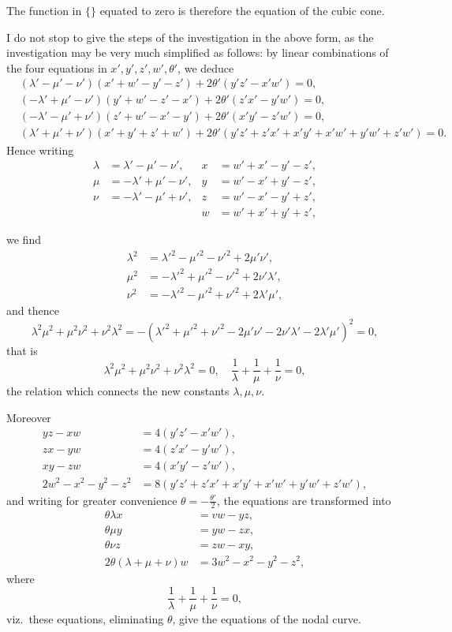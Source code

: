 \documentclass[11pt,a4paper]{article}
\theoremstyle{definition}
\begin{document}
The function in $\{\}$ equated to zero is therefore the equation of the cubic cone.

I do not stop to give the steps of the investigation in the above form, as the investigation may be very much simplified as follows: by linear combinations of the four equations in $x', y', z', w', \theta'$, we deduce
\begin{align*}
&(\lambda' - \mu' - \nu')(x'+w'-y'-z') + 2\theta'(y'z' - x'w') = 0,\\
&(-\lambda' + \mu' - \nu')(y'+w'-z'-x') + 2\theta'(z'x' - y'w') = 0,\\
&(-\lambda' - \mu' + \nu')(z'+w'-x'-y') + 2\theta'(x'y' - z'w') = 0,\\
&(\lambda' + \mu' + \nu')(x'+y'+z'+w') + 2\theta'(y'z'+z'x'+x'y'+x'w'+y'w'+z'w') = 0.
\end{align*}
Hence writing
\begin{align*}
\lambda &= \lambda' - \mu' - \nu', & x &= w' + x' - y' - z',\\
\mu &= -\lambda' + \mu' - \nu', & y &= w' - x' + y' - z',\\
\nu &= -\lambda' - \mu' + \nu', & z &= w' - x' - y' + z',\\
& & w &= w' + x' + y' + z',
\end{align*}

\newpage

we find
\begin{align*}
\lambda^2 &= \lambda'^2 - \mu'^2 - \nu'^2 + 2\mu'\nu',\\
\mu^2 &= -\lambda'^2 + \mu'^2 - \nu'^2 + 2\nu'\lambda',\\
\nu^2 &= -\lambda'^2 - \mu'^2 + \nu'^2 + 2\lambda'\mu',
\end{align*}
and thence
\[
\lambda^2\mu^2 + \mu^2\nu^2 + \nu^2\lambda^2 = -(\lambda'^2 + \mu'^2 + \nu'^2 - 2\mu'\nu' - 2\nu'\lambda' - 2\lambda'\mu')^2 = 0,
\]
that is
\[
\lambda^2\mu^2 + \mu^2\nu^2 + \nu^2\lambda^2 = 0,\quad \frac{1}{\lambda} + \frac{1}{\mu} + \frac{1}{\nu} = 0,
\]
the relation which connects the new constants $\lambda, \mu, \nu$.

Moreover
\begin{align*}
yz - xw &= 4(y'z' - x'w'),\\
zx - yw &= 4(z'x' - y'w'),\\
xy - zw &= 4(x'y' - z'w'),\\
2w^2 - x^2 - y^2 - z^2 &= 8(y'z' + z'x' + x'y' + x'w' + y'w' + z'w'),
\end{align*}
and writing for greater convenience $\theta = -\frac{\theta'}{2}$, the equations are transformed into
\begin{align*}
\theta\lambda x &= vw - yz,\\
\theta\mu y &= yw - zx,\\
\theta\nu z &= zw - xy,\\
2\theta(\lambda + \mu + \nu)w &= 3w^2 - x^2 - y^2 - z^2,
\end{align*}
where
\[
\frac{1}{\lambda} + \frac{1}{\mu} + \frac{1}{\nu} = 0,
\]
viz.\ these equations, eliminating $\theta$, give the equations of the nodal curve.
\end{document}
